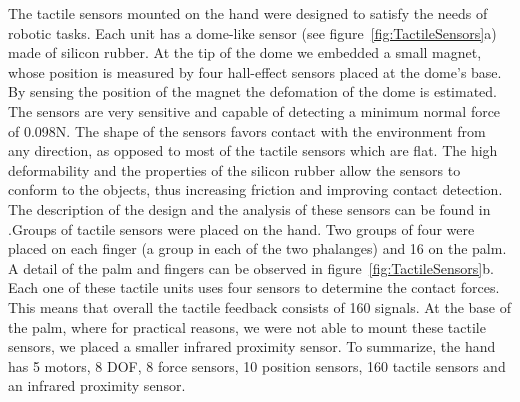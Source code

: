 The tactile sensors mounted on the hand were designed to satisfy the
needs of robotic tasks. Each unit has a dome-like sensor (see
figure~\ref{fig:TactileSensors}a) made of silicon rubber. At the
tip of the dome we embedded a small magnet, whose position is
measured by four hall-effect sensors placed at the dome's base. By
sensing the position of the magnet the defomation of the dome
is estimated. The sensors are very sensitive and capable of 
detecting a minimum normal force of 0.098N. The shape of the sensors 
favors contact with the environment from any direction, as 
opposed to most of the tactile sensors which are
flat. The high deformability and the properties of the silicon
rubber allow the sensors to conform to the objects, thus
increasing friction and improving contact detection. 
The description of the design and the analysis of these
sensors can be found in \cite{etorresjSoft}.Groups of tactile 
sensors were placed on the hand. Two groups of four were placed 
on each finger (a group in each of the two
phalanges) and 16 on the palm. A detail of the palm and fingers
can be observed in figure~\ref{fig:TactileSensors}b. Each one of
these tactile units uses four sensors to determine the contact
forces. This means that overall the tactile feedback consists of
160 signals. At the base of the palm, where for practical reasons,
we were not able to mount these tactile sensors, we placed a
smaller infrared proximity sensor. To summarize, the hand has 5
motors, 8 DOF, 8 force sensors, 10 position sensors, 160 tactile
sensors and an infrared proximity sensor.

